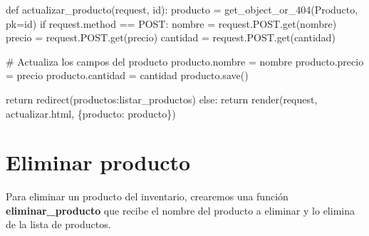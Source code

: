 \documentclass[
  a4paper,
  DIV=11,
  numbers=noendperiod,
  onepage,
  openany]{scrreprt}
\newenvironment{Shaded}{\begin{snugshade}}{\end{snugshade}}
\newcommand{\BuiltInTok}[1]{\textcolor[rgb]{0.00,0.23,0.31}{#1}}
\newcommand{\CommentTok}[1]{\textcolor[rgb]{0.37,0.37,0.37}{#1}}
\newcommand{\ControlFlowTok}[1]{\textcolor[rgb]{0.00,0.23,0.31}{#1}}
\newcommand{\KeywordTok}[1]{\textcolor[rgb]{0.00,0.23,0.31}{#1}}
\newcommand{\NormalTok}[1]{\textcolor[rgb]{0.00,0.23,0.31}{#1}}
\newcommand{\OperatorTok}[1]{\textcolor[rgb]{0.37,0.37,0.37}{#1}}
\newcommand{\StringTok}[1]{\textcolor[rgb]{0.13,0.47,0.30}{#1}}
\begin{document}
\begin{Shaded}
\begin{Highlighting}[]
\KeywordTok{def}\NormalTok{ actualizar\_producto(request, }\BuiltInTok{id}\NormalTok{):}
\NormalTok{    producto }\OperatorTok{=}\NormalTok{ get\_object\_or\_404(Producto, pk}\OperatorTok{=}\BuiltInTok{id}\NormalTok{)}
    \ControlFlowTok{if}\NormalTok{ request.method }\OperatorTok{==} \StringTok{\textquotesingle{}POST\textquotesingle{}}\NormalTok{:}
\NormalTok{        nombre }\OperatorTok{=}\NormalTok{ request.POST.get(}\StringTok{\textquotesingle{}nombre\textquotesingle{}}\NormalTok{)}
\NormalTok{        precio }\OperatorTok{=}\NormalTok{ request.POST.get(}\StringTok{\textquotesingle{}precio\textquotesingle{}}\NormalTok{)}
\NormalTok{        cantidad }\OperatorTok{=}\NormalTok{ request.POST.get(}\StringTok{\textquotesingle{}cantidad\textquotesingle{}}\NormalTok{)}
        
        \CommentTok{\# Actualiza los campos del producto}
\NormalTok{        producto.nombre }\OperatorTok{=}\NormalTok{ nombre}
\NormalTok{        producto.precio }\OperatorTok{=}\NormalTok{ precio}
\NormalTok{        producto.cantidad }\OperatorTok{=}\NormalTok{ cantidad}
\NormalTok{        producto.save()}
        
        \ControlFlowTok{return}\NormalTok{ redirect(}\StringTok{\textquotesingle{}productos:listar\_productos\textquotesingle{}}\NormalTok{)}
    \ControlFlowTok{else}\NormalTok{:}
        \ControlFlowTok{return}\NormalTok{ render(request, }\StringTok{\textquotesingle{}actualizar.html\textquotesingle{}}\NormalTok{, \{}\StringTok{\textquotesingle{}producto\textquotesingle{}}\NormalTok{: producto\})}
\end{Highlighting}
\end{Shaded}

\section{Eliminar producto}\label{eliminar-producto}

Para eliminar un producto del inventario, crearemos una función
\textbf{eliminar\_producto} que recibe el nombre del producto a eliminar
y lo elimina de la lista de productos.
\end{document}
